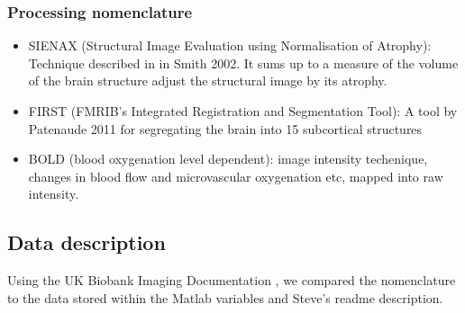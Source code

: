 \documentclass{article}
\begin{document}
\subsubsection{Processing nomenclature}
\begin{itemize}
\item SIENAX (Structural Image Evaluation using Normalisation of Atrophy): Technique described in in Smith 2002. It sums up to a measure of the volume of the brain structure adjust the structural image by its atrophy.
  \item FIRST (FMRIB's Integrated Registration and Segmentation Tool): A tool by Patenaude 2011 for segregating the brain into 15 subcortical structures
    \item BOLD (blood oxygenation level dependent):  image intensity techenique, changes in blood flow and microvascular oxygenation etc, mapped into raw intensity.
\end{itemize}

\subsection{Data description\label{data}}

Using the UK Biobank Imaging Documentation \cite{Smith2016}, we compared the nomenclature to the data stored within the Matlab variables and Steve's readme description.
\end{document}
